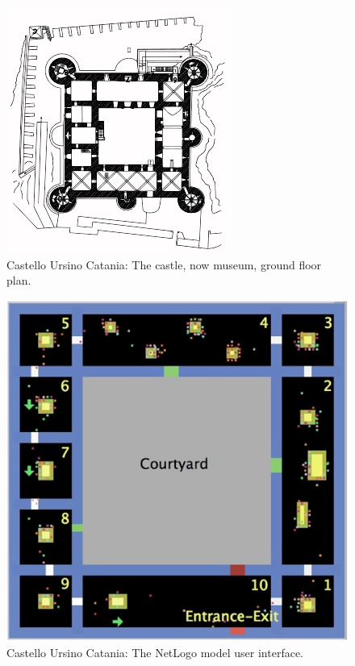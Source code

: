 \begin{figure}[htbp] %
   \centering
   \includegraphics[width=\textwidth]{figures/Fig01.png}  
   \caption{Castello Ursino Catania: The castle, now museum, ground floor plan.} %
   \label{fig:CastelloUrsinoCatania_1}
\end{figure}

\begin{figure}[htbp] %
   \centering
  \includegraphics[width=\textwidth]{figures/Fig02.png}  
   \caption{Castello Ursino Catania: The NetLogo model user interface.} %
   \label{fig:CastelloUrsinoCatania_2}
\end{figure}

